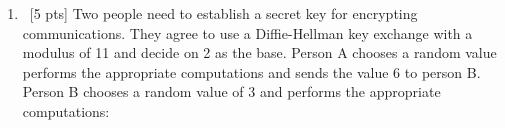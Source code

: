 \documentclass[12pt]{article}
\newenvironment{sol}[1][Solution]{\begin{trivlist}\item[\hskip\labelsep {\bfseries #1:}]}{\end{trivlist}}
\begin{document}
\begin{enumerate}
    \item \ [5 pts] Two people need to establish a secret key for encrypting communications. They agree to use a Diffie-Hellman key exchange with a modulus of 11 and decide on 2 as the base. Person A chooses a random value performs the appropriate computations and sends the value 6 to person B. Person B chooses a random value of 3 and performs the appropriate computations:


\end{enumerate}
\end{document}
